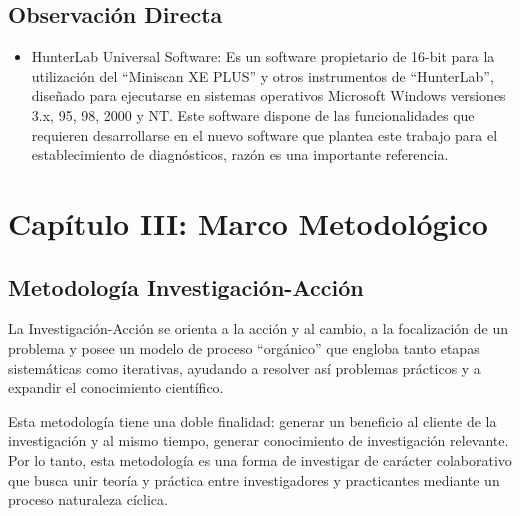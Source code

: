 \documentclass[12pt, a4paper]{article}
\begin{document}
\subsection{Observaci\'{o}n Directa}
	\begin{itemize}
		\item HunterLab Universal Software: Es un software propietario de 16-bit para la utilizaci\'{o}n del ``Miniscan XE PLUS'' y otros instrumentos de “HunterLab”, dise\~{n}ado para ejecutarse en sistemas operativos Microsoft Windows versiones 3.x, 95, 98, 2000 y NT. Este software dispone de las funcionalidades que requieren desarrollarse en el nuevo software que plantea este trabajo para el establecimiento de diagn\'{o}sticos, raz\'{o}n es una importante referencia.
	\end{itemize}
\pagebreak
\section{Cap\'{i}tulo III: Marco Metodol\'{o}gico}
	\subsection{Metodolog\'{i}a Investigaci\'{o}n-Acci\'{o}n}
	La Investigaci\'{o}n-Acci\'{o}n se orienta a la acci\'{o}n y al cambio, a la focalizaci\'{o}n de un problema y posee un modelo de proceso ``org\'{a}nico'' que engloba tanto etapas sistem\'{a}ticas como iterativas, ayudando a resolver as\'{i} problemas pr\'{a}cticos y a expandir el conocimiento cient\'{i}fico.

	Esta metodolog\'{i}a tiene una doble finalidad: generar un beneficio al cliente de la investigaci\'{o}n y al mismo tiempo, generar conocimiento de investigaci\'{o}n relevante. Por lo tanto, esta metodolog\'{i}a es una forma de investigar de car\'{a}cter colaborativo que busca unir teor\'{i}a y pr\'{a}ctica entre investigadores y practicantes mediante un proceso naturaleza c\'{i}clica.
\end{document}
